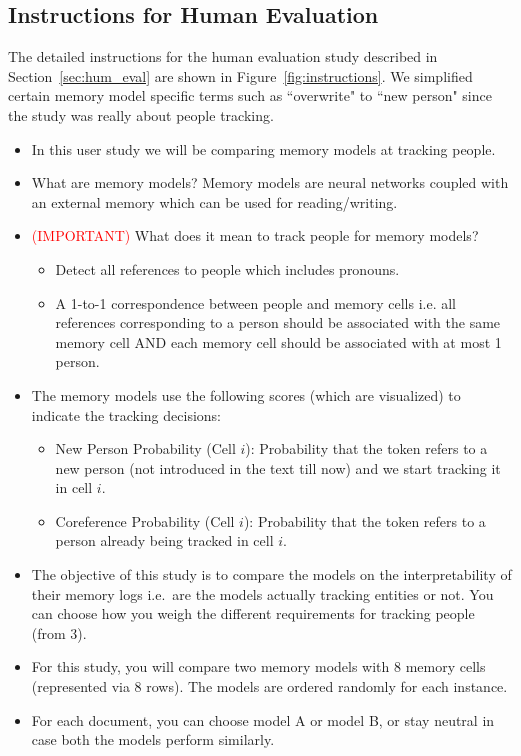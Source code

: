 \documentclass[11pt,a4paper]{article}
\begin{document}
\subsection{Instructions for Human Evaluation}
The detailed instructions for the human evaluation study described in Section~\ref{sec:hum_eval} are shown in Figure~\ref{fig:instructions}.
We simplified certain memory model specific terms such as ``overwrite" to ``new person" since the study was really about people tracking.
\label{sec:app_hum_eval}
\begin{figure*}[ht]
\begin{mdframed}\begin{itemize}
    \item In this user study we will be comparing memory models at tracking people.
    \item What are memory models? Memory models are neural networks coupled with an external memory which can be used for reading/writing.
    \item \textcolor{red}{(IMPORTANT)} What does it mean to track people for memory models?
    \begin{itemize}
        \item Detect all references to people which includes pronouns.
        \item A 1-to-1 correspondence between people and memory cells i.e. all references corresponding to a person should be associated with the same memory cell AND each memory cell should be associated with at most 1 person.
    \end{itemize}

    \item The memory models use the following scores (which are visualized) to indicate the tracking decisions:
    \begin{itemize}
    \item New Person Probability (Cell $i$): Probability that the token refers to a new person (not introduced in the text till now) and we start tracking it in cell $i$.
    \item Coreference Probability (Cell $i$): Probability that the token refers to a person already being tracked in cell $i$.
    \end{itemize}
    \item The objective of this study is to compare the models on the interpretability of their memory logs i.e.\ are the models actually tracking entities or not. You can choose how you weigh the different requirements for tracking people (from 3).
    \item For this study, you will compare two memory models with 8 memory cells (represented via 8 rows). The models are ordered randomly for each instance.
    \item For each document, you can choose model A or model B, or stay neutral in case both the models perform similarly.
    \end{itemize}
\end{mdframed}
\caption{Instructions for the human evaluation study.}
\label{fig:instructions}
\end{figure*}
\end{document}
